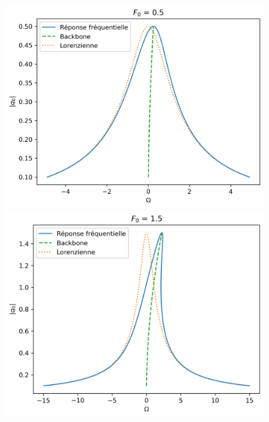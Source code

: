 \begin{figure}
    
    \begin{subcaptionblock}{.31\linewidth}
      \includegraphics[width=\linewidth]{images/duffing/F0=0.5.png}%
    \end{subcaptionblock}
    \begin{subcaptionblock}{.31\linewidth}
      \includegraphics[width=\linewidth]{images/duffing/F0=1.5.png}%
    \end{subcaptionblock}
    \begin{subcaptionblock}{.31\linewidth}

\end{subcaptionblock}
\end{figure}
